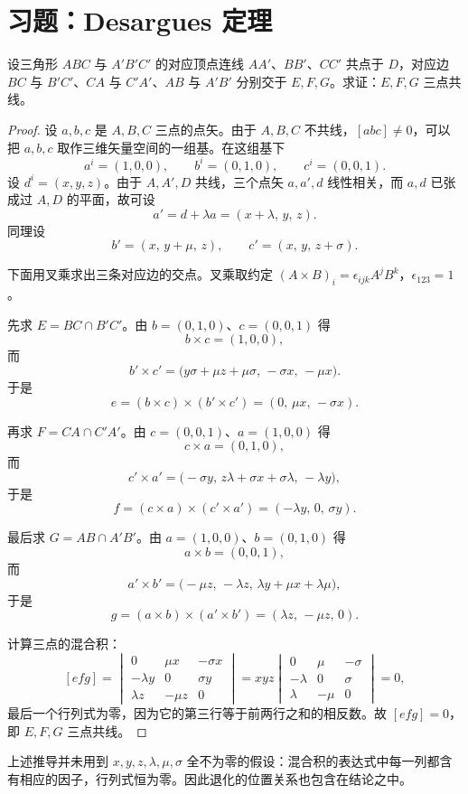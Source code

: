 \section{习题：Desargues 定理}

\begin{exercise}[Desargues 定理]
设三角形 $ABC$ 与 $A'B'C'$ 的对应顶点连线 $AA'$、$BB'$、$CC'$ 共点于 $D$，对应边 $BC$ 与 $B'C'$、$CA$ 与 $C'A'$、$AB$ 与 $A'B'$ 分别交于 $E,F,G$。求证：$E,F,G$ 三点共线。
\end{exercise}

\begin{proof}
设 $a,b,c$ 是 $A,B,C$ 三点的点矢。由于 $A,B,C$ 不共线，$[abc]\neq 0$，可以把 $a,b,c$ 取作三维矢量空间的一组基。在这组基下
\[
a^i=(1,0,0),\qquad b^i=(0,1,0),\qquad c^i=(0,0,1).
\]
设 $d^i=(x,y,z)$。由于 $A,A',D$ 共线，三个点矢 $a,a',d$ 线性相关，而 $a,d$ 已张成过 $A,D$ 的平面，故可设
\[
a'=d+\lambda a=(x+\lambda,\,y,\,z).
\]
同理设
\[
b'=(x,\,y+\mu,\,z),\qquad c'=(x,\,y,\,z+\sigma).
\]

下面用叉乘求出三条对应边的交点。叉乘取约定 $(A\times B)_i=\epsilon_{ijk}A^jB^k$，$\epsilon_{123}=1$。

先求 $E=BC\cap B'C'$。由 $b=(0,1,0)$、$c=(0,0,1)$ 得
\[
b\times c=(1,0,0),
\]
而
\[
b'\times c'=\big(y\sigma+\mu z+\mu\sigma,\,-\sigma x,\,-\mu x\big).
\]
于是
\[
e=(b\times c)\times(b'\times c')=(0,\,\mu x,\,-\sigma x).
\]

再求 $F=CA\cap C'A'$。由 $c=(0,0,1)$、$a=(1,0,0)$ 得
\[
c\times a=(0,1,0),
\]
而
\[
c'\times a'=\big(-\sigma y,\,z\lambda+\sigma x+\sigma\lambda,\,-\lambda y\big),
\]
于是
\[
f=(c\times a)\times(c'\times a')=(-\lambda y,\,0,\,\sigma y).
\]

最后求 $G=AB\cap A'B'$。由 $a=(1,0,0)$、$b=(0,1,0)$ 得
\[
a\times b=(0,0,1),
\]
而
\[
a'\times b'=\big(-\mu z,\,-\lambda z,\,\lambda y+\mu x+\lambda\mu\big),
\]
于是
\[
g=(a\times b)\times(a'\times b')=(\lambda z,\,-\mu z,\,0).
\]

计算三点的混合积：
\[
[efg]=
\begin{vmatrix}
0 & \mu x & -\sigma x\\
-\lambda y & 0 & \sigma y\\
\lambda z & -\mu z & 0
\end{vmatrix}
=xyz
\begin{vmatrix}
0 & \mu & -\sigma\\
-\lambda & 0 & \sigma\\
\lambda & -\mu & 0
\end{vmatrix}=0,
\]
最后一个行列式为零，因为它的第三行等于前两行之和的相反数。故 $[efg]=0$，即 $E,F,G$ 三点共线。
\end{proof}

\begin{remark}
上述推导并未用到 $x,y,z,\lambda,\mu,\sigma$ 全不为零的假设：混合积的表达式中每一列都含有相应的因子，行列式恒为零。因此退化的位置关系也包含在结论之中。
\end{remark}
